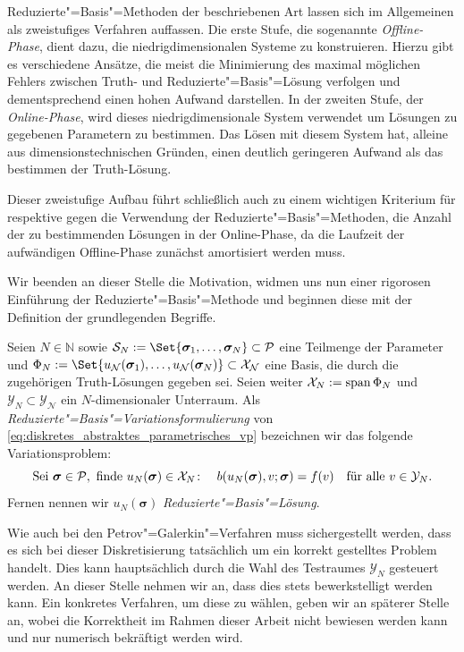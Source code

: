 \documentclass[../main.tex]{subfiles}
\begin{document}
Reduzierte"=Basis"=Methoden der beschriebenen Art lassen sich im Allgemeinen als zweistufiges Verfahren auffassen.
Die erste Stufe, die sogenannte \emph{Offline-Phase}, dient dazu, die niedrigdimensionalen Systeme zu konstruieren.
Hierzu gibt es verschiedene Ansätze, die meist die Minimierung des maximal möglichen Fehlers zwischen Truth- und Reduzierte"=Basis"=Lösung verfolgen und dementsprechend einen hohen Aufwand darstellen.
In der zweiten Stufe, der \emph{Online-Phase}, wird dieses niedrigdimensionale System verwendet um Lösungen zu gegebenen Parametern zu bestimmen.
Das Lösen mit diesem System hat, alleine aus dimensionstechnischen Gründen, einen deutlich geringeren Aufwand als das bestimmen der Truth-Lösung.

Dieser zweistufige Aufbau führt schließlich auch zu einem wichtigen Kriterium für respektive gegen die Verwendung der Reduzierte"=Basis"=Methoden, die Anzahl der zu bestimmenden Lösungen in der Online-Phase, da die Laufzeit der aufwändigen Offline-Phase zunächst amortisiert werden muss.

Wir beenden an dieser Stelle die Motivation, widmen uns nun einer rigorosen Einführung der Reduzierte"=Basis"=Methode und beginnen diese mit der Definition der grundlegenden Begriffe.

\begin{Definition}
\label{definition:rb_variationsproblem}
    Seien $N \in \mathbb{N}$ sowie $\mathcal S_{N} := \Set{ \bm \sigma_{1}, \dots, \bm \sigma_{N} } \subset \mathcal P$ eine Teilmenge der Parameter und $\Phi_{N} := \Set{ u_{\mathcal N}(\bm \sigma_{1}), \dots, u_{\mathcal N}(\bm \sigma_{N})} \subset \mathcal X_{\mathcal N}$ eine Basis, die durch die zugehörigen Truth-Lösungen gegeben sei.
    Seien weiter $\mathcal X_{N} := \operatorname{span} \Phi_{N}$ und $\mathcal Y_{N} \subset \mathcal Y_{\mathcal N}$ ein $N$-dimensionaler Unterraum.
    Als \emph{Reduzierte"=Basis"=Variationsformulierung} von \cref{eq:diskretes_abstraktes_parametrisches_vp} bezeichnen wir das folgende Variationsproblem:
    \begin{equation}
    \label{eq:rb_abstraktes_parametriches_vp}
        \text{Sei } \bm \sigma \in \mathcal P, \text{ finde } u_{N}(\bm \sigma) \in \mathcal X_{N} \colon \quad b(u_{N}(\bm \sigma), v; \bm \sigma) = f(v) \quad \fa v \in \mathcal Y_{N}.
    \end{equation}
    Fernen nennen wir $u_{N}(\bm \sigma)$ \emph{Reduzierte"=Basis"=Lösung}.
\end{Definition}

Wie auch bei den Petrov"=Galerkin"=Verfahren muss sichergestellt werden, dass es sich bei dieser Diskretisierung tatsächlich um ein korrekt gestelltes Problem handelt.
Dies kann hauptsächlich durch die Wahl des Testraumes $\mathcal Y_{N}$ gesteuert werden.
An dieser Stelle nehmen wir an, dass dies stets bewerkstelligt werden kann.
Ein konkretes Verfahren, um diese zu wählen, geben wir an späterer Stelle an, wobei die Korrektheit im Rahmen dieser Arbeit nicht bewiesen werden kann und nur numerisch bekräftigt werden wird.
\end{document}
